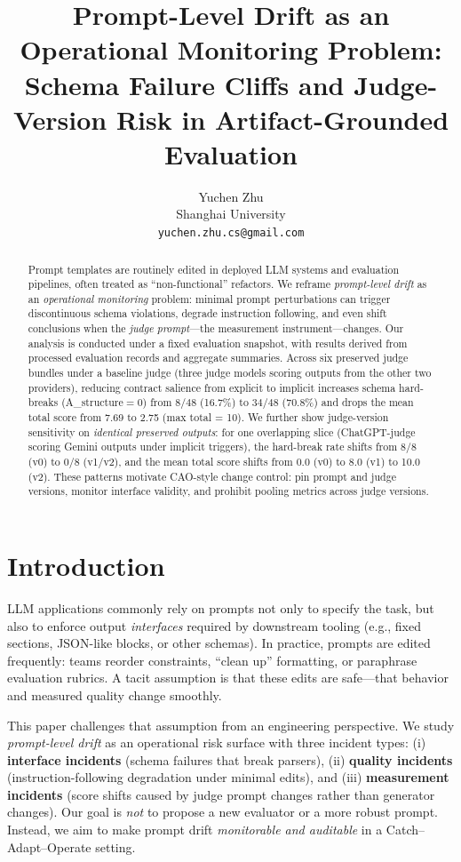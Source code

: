 \documentclass{article}
\title{Prompt-Level Drift as an Operational Monitoring Problem:\\
Schema Failure Cliffs and Judge-Version Risk in Artifact-Grounded Evaluation}
\author{
Yuchen Zhu \\
Shanghai University \\
\texttt{yuchen.zhu.cs@gmail.com}
}
\newcommand{\Astruct}{A\_structure}
\begin{document}
\raggedbottom
\maketitle

\begin{abstract}
Prompt templates are routinely edited in deployed LLM systems and evaluation pipelines, often treated as ``non-functional'' refactors.
We reframe \emph{prompt-level drift} as an \emph{operational monitoring} problem: minimal prompt perturbations can trigger discontinuous schema violations, degrade instruction following, and even shift conclusions when the \emph{judge prompt}—the measurement instrument—changes.
Our analysis is conducted under a fixed evaluation snapshot, with results derived from processed evaluation records and aggregate summaries.
Across six preserved judge bundles under a baseline judge (three judge models scoring outputs from the other two providers), reducing contract salience from explicit to implicit increases schema hard-breaks (\Astruct$=0$) from $8/48$ (16.7\%) to $34/48$ (70.8\%) and drops the mean total score from 7.69 to 2.75 (max total = 10).
We further show judge-version sensitivity on \emph{identical preserved outputs}: for one overlapping slice (ChatGPT-judge scoring Gemini outputs under implicit triggers), the hard-break rate shifts from $8/8$ (v0) to $0/8$ (v1/v2), and the mean total score shifts from 0.0 (v0) to 8.0 (v1) to 10.0 (v2).
These patterns motivate CAO-style change control: pin prompt and judge versions, monitor interface validity, and prohibit pooling metrics across judge versions.
\end{abstract}

\section{Introduction}
LLM applications commonly rely on prompts not only to specify the task, but also to enforce output \emph{interfaces} required by downstream tooling (e.g., fixed sections, JSON-like blocks, or other schemas).
In practice, prompts are edited frequently: teams reorder constraints, ``clean up'' formatting, or paraphrase evaluation rubrics.
A tacit assumption is that these edits are safe---that behavior and measured quality change smoothly.

This paper challenges that assumption from an engineering perspective.
We study \emph{prompt-level drift} as an operational risk surface with three incident types:
(i) \textbf{interface incidents} (schema failures that break parsers),
(ii) \textbf{quality incidents} (instruction-following degradation under minimal edits), and
(iii) \textbf{measurement incidents} (score shifts caused by judge prompt changes rather than generator changes).
Our goal is \emph{not} to propose a new evaluator or a more robust prompt.
Instead, we aim to make prompt drift \emph{monitorable and auditable} in a Catch--Adapt--Operate setting.
\end{document}
